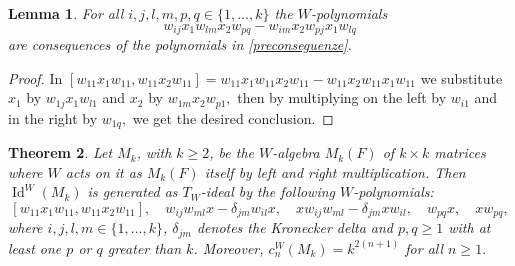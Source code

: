 \documentclass[reqno]{amsart}
\newtheorem{theorem}{Theorem}
\newtheorem{lemma}[theorem]{Lemma}
\theoremstyle{definition}
\numberwithin{equation}{section}
\numberwithin{theorem}{section}
\DeclareMathOperator{\I}{Id}
\begin{document}
\begin{lemma}\label{conseguenzastrana}
    For all $i,j,l,m,p,q\in\{1,\ldots, k\}$ the $W$-polynomials
    $$
    w_{ij}x_1w_{lm}x_2w_{pq} - w_{im}x_2w_{pj}x_1w_{lq}
    $$
    are consequences of the polynomials in \eqref{preconseguenze}.
\end{lemma}
\begin{proof}
    In $[w_{11}x_1w_{11},w_{11}x_2w_{11}] = w_{11}x_1w_{11}x_2w_{11}-w_{11}x_2w_{11}x_1w_{11}$ we substitute $x_1$ by $w_{1j}x_1w_{l1}$ and $x_2$ by $w_{1m}x_2w_{p1},$ then by multiplying on the left by $w_{i1}$ and in the right by $w_{1q},$ we get the desired conclusion.
\end{proof}

\begin{theorem}\label{identitadellematriciecodimensioni}
   Let $M_k$, with $k\geq 2$,  be the $W$-algebra $M_k(F)$ of $k\times k$ matrices where $W$ acts on it as  $M_k(F)$ itself by left and right multiplication. 
    Then $\I^W(M_k)$ is generated as $T_W$-ideal by the following $W$-polynomials:
    $$
    [w_{11}x_1w_{11},w_{11}x_2w_{11}], \quad w_{ij}w_{ml}x-\delta_{jm}w_{il}x, \quad xw_{ij}w_{ml}-\delta_{jm}xw_{il}, \quad w_{pq}x, \quad xw_{pq},
    $$
    where $i,j,l,m\in \{1,\ldots, k\}$, $\delta_{jm}$ denotes the Kronecker delta and $p,q\geq 1$ with at least one $p$ or $q$ greater than $k$. Moreover, $c_n^W(M_k) = k^{2(n+1)}$ for all $n\geq 1.$
\end{theorem}
\end{document}
